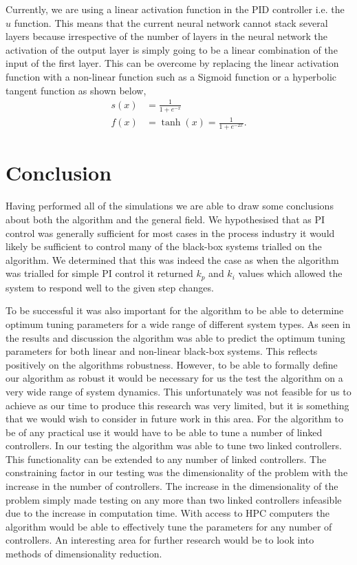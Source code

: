 \documentclass[conference]{IEEEtran}
\theoremstyle{definition}
\begin{document}
Currently, we are using a linear activation function in the PID controller i.e. the $u$ function. This means that the current neural network cannot stack several layers because irrespective of the number of layers in the neural network the activation of the output layer is simply going to be a linear combination of the input of the first layer. This can be overcome by replacing the linear activation function with a non-linear function such as a Sigmoid function or a hyperbolic tangent function as shown below, 
\begin{align}
    s(x) &= \frac{1}{1 + e^{-x}} \\
    f(x) &= \tanh(x) = \frac{1}{1+e^{-2x}}.
\end{align}
\vspace{2mm}
\section{Conclusion}
\noindent Having performed all of the simulations we are able to draw some conclusions about both the algorithm and the general field. We hypothesised that as PI control was generally sufficient for most cases in the process industry it would likely be sufficient to control many of the black-box systems trialled on the algorithm. We determined that this was indeed the case as when the algorithm was trialled for simple PI control it returned $k_p$ and $k_i$ values which allowed the system to respond well to the given step changes. 

To be successful it was also important for the algorithm to be able to determine optimum tuning parameters for a wide range of different system types. As seen in the results and discussion the algorithm was able to predict the optimum tuning parameters for both linear and non-linear black-box systems. This reflects positively on the algorithms robustness. However, to be able to formally define our algorithm as robust it would be necessary for us the test the algorithm on a very wide range of system dynamics. This unfortunately was not feasible for us to achieve as our time to produce this research was very limited, but it is something that we would wish to consider in future work in this area. For the algorithm to be of any practical use it would have to be able to tune a number of linked controllers. In our testing the algorithm was able to tune two linked controllers. This functionality can be extended to any number of linked controllers. The constraining factor in our testing was the dimensionality of the problem with the increase in the number of controllers. The increase in the dimensionality of the problem simply made testing on any more than two linked controllers infeasible due to the increase in computation time. With access to HPC computers the algorithm would be able to effectively tune the parameters for any number of controllers. An interesting area for further research would be to look into methods of dimensionality reduction. 
\end{document}
